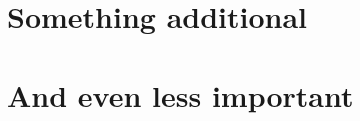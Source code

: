 \begin{appendices}
\section{Something additional}

\section{And even less important}

\end{appendices}

